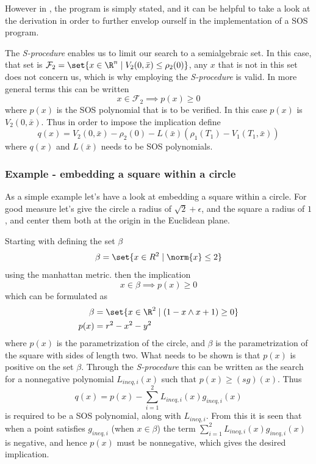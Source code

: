 However in \cite[Majumdar and Tedrake]{majumdarFunnelLibrariesRealtime2017}, the
program is simply stated, and it can be helpful to take a look at the derivation
in order to further envelop ourself in the implementation of a \ac{SOS} program.

The \textit{S-procedure} enables us to limit our search to a semialgebraic set.
In this case, that set is \(\mathcal{F}_2 = \set{x \in \R^n \mid V_2(0,\bar{x})
  \leq \rho_2(0)}\), any \(x\) that is not in this set does not concern us,
which is why employing the \textit{S-procedure} is valid. In more general terms
this can be written
\[
  x \in \mathcal{F}_2 \implies p(x) \geq 0
\]
where \(p(x)\) is the \ac{SOS} polynomial that is to be verified. In this case
\(p(x)\) is \(V_2(0,\bar{x})\). Thus in order to impose the implication define
\[
  q(x) = V_2(0,\bar{x}) - \rho_2(0) - L(\bar{x}) \left( \rho_1(T_1) -
    V_1(T_1,\bar{x}) \right)
\]
where \(q(x)\) and \(L(\bar{x})\) needs to be SOS polynomials.

\subsubsection{Example - embedding a square within a circle}

As a simple example let's have a look at embedding a square within a circle. For
good measure let's give the circle a radius of \(\sqrt{2}+\epsilon\), and the
square a radius of \(1\), and center them both at the origin in the Euclidean
plane.

Starting with defining the set \(\beta\)
\[
  \beta = \set{x \in R^2 \mid \norm{x} \leq 2}
\]
using the manhattan metric. then the implication
\[
  x \in \beta \implies p(x) \geq 0
\]
which can be formulated as
\begin{align*}
  \beta &= \set{x \in \R^2 \mid (1 - x \wedge x + 1) \geq 0} \\
  p(x) &= r^2 - x^2 - y^2
\end{align*}
where \(p(x)\) is the parametrization of the circle, and \(\beta\) is the
parametrization of the square with sides of length two. What needs to be shown
is that \(p(x)\) is positive on the set \(\beta\). Through the
\textit{S-procedure} this can be written as the search for a nonnegative
polynomial \(L_{ineq,i}(x)\) such that \(p(x) \geq \left( sg \right)(x)\). Thus
\[
  q(x) = p(x) - \sum_{i=1}^{2}L_{ineq,i}(x)g_{ineq,i}(x)
\]
is required to be a \ac{SOS} polynomial, along with \(L_{ineq,i}\). From this it
is seen that when a point satisfies \(g_{ineq,i}\) (\ie when \(x \in \beta\))
the term \(\sum_{i=1}^{2}L_{ineq,i}(x)g_{ineq,i}(x)\) is negative, and hence
\(p(x)\) must be nonnegative, which gives the desired implication.

